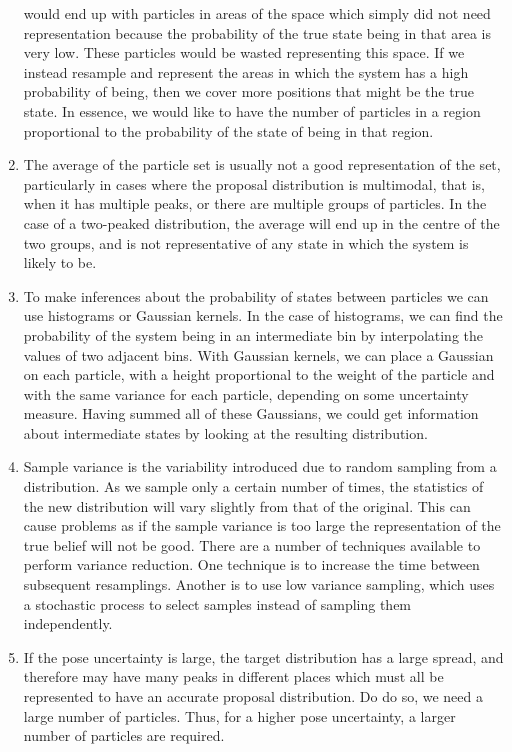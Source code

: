 \documentclass[a4paper,12pt]{article}
\begin{document}
\begin{enumerate}
  would end up with particles in areas of the space which simply did not need
  representation because the probability of the true state being in that area is
  very low. These particles would be wasted representing this space. If we
  instead resample and represent the areas in which the system has a high
  probability of being, then we cover more positions that might be the true
  state. In essence, we would like to have the number of particles in a region
  proportional to the probability of the state of being in that region.
\item The average of the particle set is usually not a good representation of
  the set, particularly in cases where the proposal distribution is multimodal,
  that is, when it has multiple peaks, or there are multiple groups of
  particles. In the case of a two-peaked distribution, the average will end up
  in the centre of the two groups, and is not representative of any state in
  which the system is likely to be.
\item To make inferences about the probability of states between particles we
  can use histograms or Gaussian kernels. In the case of histograms, we can find
  the probability of the system being in an intermediate bin by interpolating
  the values of two adjacent bins. With Gaussian kernels, we can place a
  Gaussian on each particle, with a height proportional to the weight of the
  particle and with the same variance for each particle, depending on some
  uncertainty measure. Having summed all of these Gaussians, we could get
  information about intermediate states by looking at the resulting
  distribution.
\item Sample variance is the variability introduced due to random sampling from
  a distribution. As we sample only a certain number of times, the statistics of
  the new distribution will vary slightly from that of the original. This can
  cause problems as if the sample variance is too large the representation of
  the true belief will not be good. There are a number of techniques available
  to perform variance reduction. One technique is to increase the time between
  subsequent resamplings. Another is to use low variance sampling, which uses a
  stochastic process to select samples instead of sampling them independently.
\item If the pose uncertainty is large, the target distribution has a large
  spread, and therefore may have many peaks in different places which must all
  be represented to have an accurate proposal distribution. Do do so, we need a
  large number of particles. Thus, for a higher pose uncertainty, a larger
  number of particles are required.
\end{enumerate}
\end{document}
